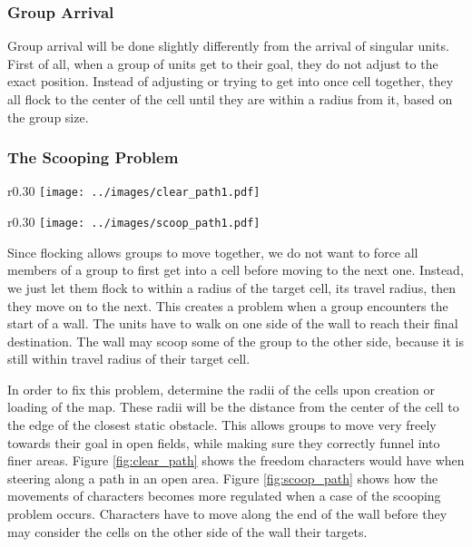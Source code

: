 \subsubsection{Group Arrival}
Group arrival will be done slightly differently from the arrival of singular units. First of all, when a group of units get to their goal, they do not adjust to the exact position. Instead of adjusting or trying to get into once cell together, they all flock to the center of the cell until they are within a radius from it, based on the group size. 

\subsubsection{The Scooping Problem}
\begin{wrapfigure}{r}{0.30\textwidth}
\texttt{[image: ../images/clear\_path1.pdf]}
\caption{A clear and open path}
\label{fig:clear_path}
\end{wrapfigure} 
\begin{wrapfigure}{r}{0.30\textwidth}
\texttt{[image: ../images/scoop\_path1.pdf]}
\caption{The scooping problem}
\label{fig:scoop_path}
\end{wrapfigure} 
Since flocking allows groups to move together, we do not want to force all members of a group to first get into a cell before moving to the next one. Instead, we just let them flock to within a radius of the target cell, its travel radius, then they move on to the next. This creates a problem when a group encounters the start of a wall. The units have to walk on one side of the wall to reach their final destination. The wall may scoop some of the group to the other side, because it is still within travel radius of their target cell.

In order to fix this problem, determine the radii of the cells upon creation or loading of the map. These radii will be the distance from the center of the cell to the edge of the closest static obstacle. This allows groups to move very freely towards their goal in open fields, while making sure they correctly funnel into finer areas. Figure \ref{fig:clear_path} shows the freedom characters would have when steering along a path in an open area. Figure \ref{fig:scoop_path} shows how the movements of characters becomes more regulated when a case of the scooping problem occurs. Characters have to move along the end of the wall before they may consider the cells on the other side of the wall their targets.

